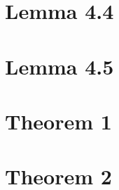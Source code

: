 \chapter{Lemma 4.4}



\chapter{Lemma 4.5}


\chapter{Theorem 1}


\chapter{Theorem 2}







\printbibliography














